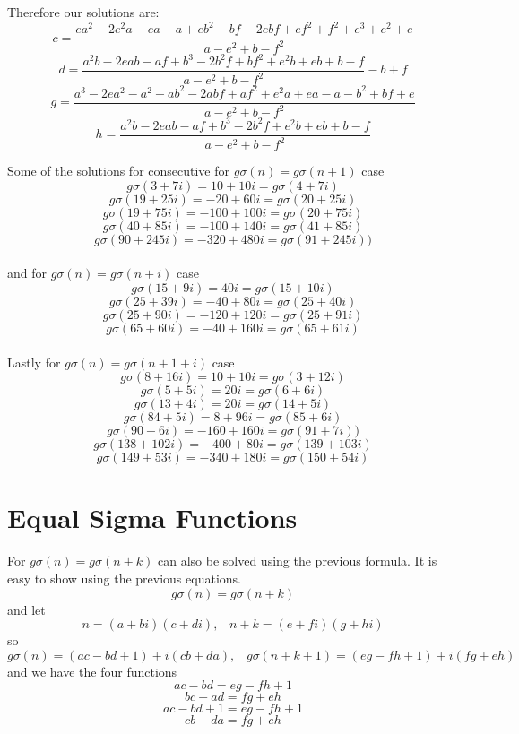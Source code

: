 \documentclass[12pt]{amsart}
\begin{document}
Therefore our solutions are: 
$$c = \frac{ea^2 - 2e^2a -ea -a + eb^2 -bf -2ebf + ef^2 + f^2 + e^3 + e^2 + e} {a-e^2+b-f^2}$$ 
$$d = \frac{a^2b - 2eab -af +b^3 -2b^2f + bf^2 + e^2b + eb + b - f}{a-e^2 + b -f^2} -b + f$$ 
$$g = \frac{a^3 -2ea^2 - a^2 + ab^2 - 2abf + af^2 + e^2a + ea - a -b^2 + bf + e} {a-e^2+b-f^2}$$ 
$$h = \frac{a^2b - 2eab -af + b^3 - 2b^2f + e^2b + eb +b -f} {a-e^2+b-f^2}$$

Some of the solutions for consecutive for $g\sigma(n) = g\sigma(n+1)$ case
\\
$$g\sigma(3 + 7i) = 10 + 10i = g\sigma(4 + 7i)$$
$$g\sigma(19 + 25i) = -20 + 60i = g\sigma(20 + 25i)$$
$$g\sigma(19 + 75i) = -100 + 100i = g\sigma(20 + 75i)$$
$$g\sigma(40 + 85i) = -100 + 140i  = g\sigma(41 + 85i)$$
$$g\sigma(90 + 245i) = -320 + 480i  = g\sigma(91 + 245i))$$
\\
and for $g\sigma(n) = g\sigma(n+i)$ case
\\
$$g\sigma(15 + 9i) = 40i = g\sigma(15 + 10i)$$
$$g\sigma(25 + 39i) = -40 + 80i  = g\sigma( 25 + 40i)$$
$$g\sigma(25 + 90i) = -120 + 120i  = g\sigma(25 + 91i)$$
$$g\sigma(65 + 60i) = -40 + 160i = g\sigma(65 + 61i)$$
\\
Lastly for $g\sigma(n) = g\sigma(n+1+i)$ case
\\
$$g\sigma(8 + 16i) = 10 + 10i = g\sigma(3 + 12i)$$
$$g\sigma(5 + 5i) = 20i = g\sigma(6 + 6i)$$
$$g\sigma(13 + 4i) = 20i = g\sigma(14 + 5i)$$
$$g\sigma(84 + 5i) = 8 + 96i  = g\sigma(85 + 6i)$$
$$g\sigma(90 + 6i) = -160 + 160i  = g\sigma(91 + 7i))$$
$$g\sigma(138 + 102i) = -400 + 80i = g\sigma(139 + 103i)$$
$$g\sigma(149 + 53i) = -340 + 180i = g\sigma(150 + 54i)$$

\section{Equal Sigma Functions}
For $g\sigma(n) = g\sigma(n+k)$ can also be solved using the previous formula. It is easy to show using the previous equations. 
$$g\sigma(n) = g\sigma(n+k)$$
and let $$n = (a + bi)(c+di), \; \; \; n+k = (e + fi)(g + hi)$$ so $$ g\sigma(n) = (ac -bd + 1) + i(cb + da) , \; \; \; g\sigma(n+k+1) = (eg - fh + 1) + i(fg + eh)$$ and we have the four functions $$ac -bd = eg -fh + 1$$ $$bc + ad = fg + eh$$ $$ac - bd + 1 = eg - fh + 1$$ $$cb + da = fg + eh$$
\end{document}
